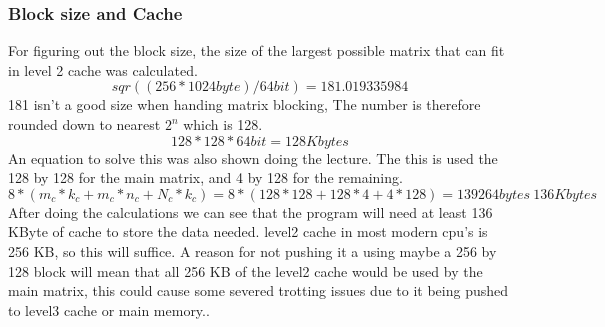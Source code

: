 \documentclass[a4paper,10pt,titlepage]{report}
\begin{document}
\subsubsection{Block size and Cache}
For figuring out the block size, the size of the largest possible matrix that can fit in level 2 cache was calculated.
\begin{equation}
sqr((256*1024 byte)/64 bit) = 181.019335984
\end{equation}
181 isn't a good size when handing matrix blocking, The number is therefore rounded down to nearest $2^n$ which is 128.
\begin{equation}
128 * 128 * 64 bit = 128 Kbytes
\end{equation}
An equation to solve this was also shown doing the lecture. The this is used the 128 by 128 for the main matrix, and 4 by 128 for the remaining. 
\begin{equation}
8* (m_c*k_c+m_c*n_c+N_c*k_c) = 8* (128*128+128*4+4*128) = 139264 bytes ~ 136 Kbytes
\end{equation}
After doing the calculations we can see that the program will need at least 136 KByte of cache to store the data needed. level2 cache in most modern cpu's is 256 KB, so this will suffice. A reason for not pushing it a using maybe a 256 by 128 block will mean that all 256 KB of the level2 cache would be used by the main matrix, this could cause some severed trotting issues due to it being pushed to level3 cache or main memory..\\
 
\end{document}
